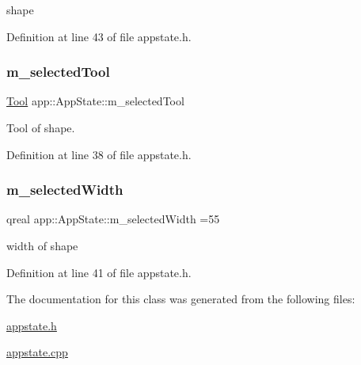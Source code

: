 shape 



Definition at line 43 of file appstate.\+h.

\mbox{\label{classapp_1_1_app_state_a80f8f7a574b269f73119edd2ed96f192}} 
\subsubsection{\texorpdfstring{m\+\_\+selected\+Tool}{m\_selectedTool}}
{\footnotesize\ttfamily \mbox{\hyperlink{classapp_1_1_app_state_aa641298e5827611da2512591c4a0e966}{Tool}} app\+::\+App\+State\+::m\+\_\+selected\+Tool\hspace{0.3cm}{\ttfamily [private]}}



Tool of shape. 



Definition at line 38 of file appstate.\+h.

\mbox{\label{classapp_1_1_app_state_ad90790bef930b14bdee28a7fb2988c85}} 
\subsubsection{\texorpdfstring{m\+\_\+selected\+Width}{m\_selectedWidth}}
{\footnotesize\ttfamily qreal app\+::\+App\+State\+::m\+\_\+selected\+Width =55\hspace{0.3cm}{\ttfamily [private]}}



width of shape 



Definition at line 41 of file appstate.\+h.



The documentation for this class was generated from the following files\+:\begin{DoxyCompactItemize}
\item 
\mbox{\hyperlink{appstate_8h}{appstate.\+h}}\item 
\mbox{\hyperlink{appstate_8cpp}{appstate.\+cpp}}\end{DoxyCompactItemize}
